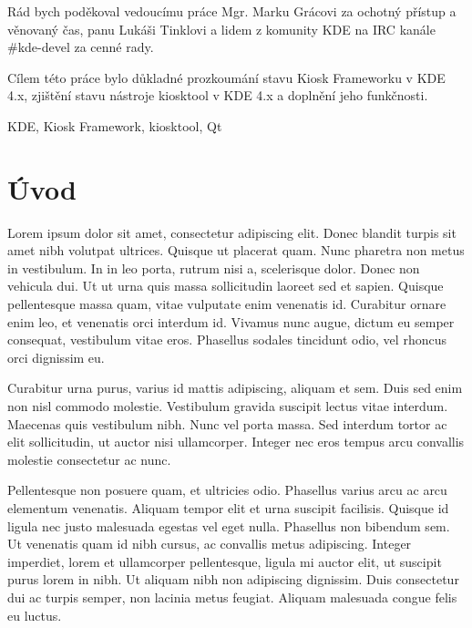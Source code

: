 \documentclass[oneside,12pt,final]{fithesis2}
\begin{document}
  
\VerbatimFootnotes
\FrontMatter  
\ThesisTitlePage  

\setcounter{page}{1} 

\begin{ThesisDeclaration}  
\DeclarationText  
\AdvisorName  
\end{ThesisDeclaration}   

\begin{ThesisThanks}  
Rád bych poděkoval vedoucímu práce Mgr. Marku Grácovi za ochotný přístup a věnovaný čas, panu Lukáši Tinklovi a lidem z komunity KDE na IRC kanále \#kde-devel za cenné rady.
\end{ThesisThanks}  
 
\begin{ThesisAbstract}  
Cílem této práce bylo důkladné prozkoumání stavu Kiosk Frameworku v KDE 4.x, zjištění stavu nástroje kiosktool v KDE 4.x a doplnění jeho funkčnosti.
\end{ThesisAbstract}  
 
\begin{ThesisKeyWords}  
KDE, Kiosk Framework, kiosktool, Qt
\end{ThesisKeyWords}  
 
\MainMatter

\tableofcontents   
\chapter{Úvod}
Lorem ipsum dolor sit amet, consectetur adipiscing elit. Donec blandit turpis sit amet nibh volutpat ultrices. Quisque ut placerat quam. Nunc pharetra non metus in vestibulum. In in leo porta, rutrum nisi a, scelerisque dolor. Donec non vehicula dui. Ut ut urna quis massa sollicitudin laoreet sed et sapien. Quisque pellentesque massa quam, vitae vulputate enim venenatis id. Curabitur ornare enim leo, et venenatis orci interdum id. Vivamus nunc augue, dictum eu semper consequat, vestibulum vitae eros. Phasellus sodales tincidunt odio, vel rhoncus orci dignissim eu.

Curabitur urna purus, varius id mattis adipiscing, aliquam et sem. Duis sed enim non nisl commodo molestie. Vestibulum gravida suscipit lectus vitae interdum. Maecenas quis vestibulum nibh. Nunc vel porta massa. Sed interdum tortor ac elit sollicitudin, ut auctor nisi ullamcorper. Integer nec eros tempus arcu convallis molestie consectetur ac nunc.

Pellentesque non posuere quam, et ultricies odio. Phasellus varius arcu ac arcu elementum venenatis. Aliquam tempor elit et urna suscipit facilisis. Quisque id ligula nec justo malesuada egestas vel eget nulla. Phasellus non bibendum sem. Ut venenatis quam id nibh cursus, ac convallis metus adipiscing. Integer imperdiet, lorem et ullamcorper pellentesque, ligula mi auctor elit, ut suscipit purus lorem in nibh. Ut aliquam nibh non adipiscing dignissim. Duis consectetur dui ac turpis semper, non lacinia metus feugiat. Aliquam malesuada congue felis eu luctus.
\end{document}
